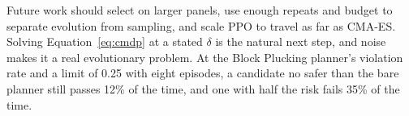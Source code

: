 \documentclass[dvipsnames,format=sigconf]{acmart}
\newcommand{\cmaes}{CMA-ES}
\begin{document}
Future work should select on larger panels, use enough repeats and budget to separate evolution from sampling, and
scale PPO to travel as far as \cmaes{}. Solving Equation~\ref{eq:cmdp} at a stated $\delta$ is the natural next step,
and noise makes it a real evolutionary problem. At the Block Plucking planner's violation rate and a limit of 0.25
with eight episodes, a candidate no safer than the bare planner still passes 12\% of the time, and one with half the
risk fails 35\% of the time. %



\end{document}
